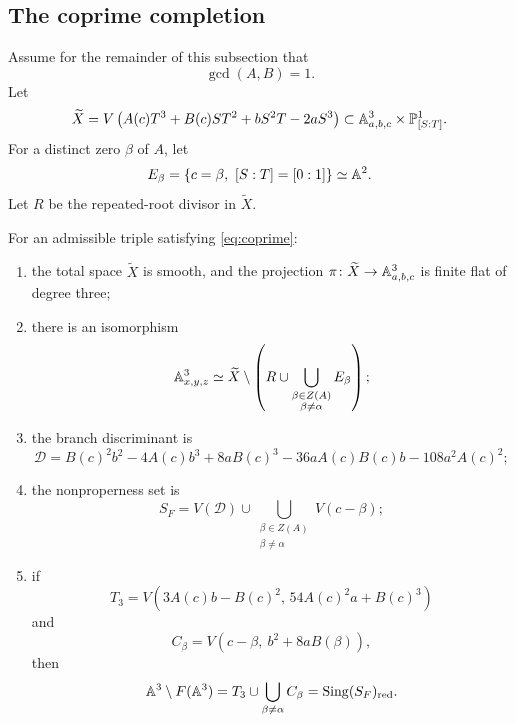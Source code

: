 \documentclass[11pt,reqno]{amsart}
\begin{document}
\subsection{The coprime completion}

Assume for the remainder of this subsection that
\begin{equation}
\label{eq:coprime}
\gcd(A,B)=1.
\end{equation}
Let
\begin{equation}
\label{eq:completion}
\widetilde X=
V\left(
A(c)T^3+B(c)ST^2+bS^2T-2aS^3
\right)
\subset
\mathbb A^3_{a,b,c}\times\mathbb P^1_{[S:T]}.
\end{equation}
For a distinct zero \(\beta\) of \(A\), let
\[
E_\beta=\set{c=\beta,\ [S:T]=[0:1]}\simeq\A^2.
\]
Let \(R\) be the repeated-root divisor in \(\widetilde X\).

\begin{theorem}
\label{thm:AB-global}
For an admissible triple satisfying \eqref{eq:coprime}:

\begin{enumerate}[label=(\roman*)]
\item the total space \(\widetilde X\) is smooth, and the projection
\(\pi\colon\widetilde X\to\mathbb A^3_{a,b,c}\) is finite flat of degree three;
\item there is an isomorphism
\begin{equation}
\label{eq:source-open}
\mathbb A^3_{x,y,z}\simeq
\widetilde X\setminus
\left(R\cup\bigcup_{\substack{\beta\in Z(A)\\\beta\ne\alpha}}E_\beta\right);
\end{equation}
\item the branch discriminant is
\begin{equation}
\label{eq:discriminant}
\mathcal D=
B(c)^2b^2-4A(c)b^3+8aB(c)^3
-36aA(c)B(c)b-108a^2A(c)^2;
\end{equation}
\item the nonproperness set is
\begin{equation}
\label{eq:nonproperness}
S_F=V(\mathcal D)\cup
\bigcup_{\substack{\beta\in Z(A)\\\beta\ne\alpha}}V(c-\beta);
\end{equation}
\item if
\[
T_3=
V\left(3A(c)b-B(c)^2,\,
54A(c)^2a+B(c)^3\right)
\]
and
\[
C_\beta=
V\left(c-\beta,\ b^2+8aB(\beta)\right),
\]
then
\begin{equation}
\label{eq:omitted}
\mathbb A^3\setminus F(\mathbb A^3)=
T_3\cup\bigcup_{\beta\ne\alpha}C_\beta
=\operatorname{Sing}(S_F)_{\mathrm{red}}.
\end{equation}
\end{enumerate}
\end{theorem}
\end{document}
